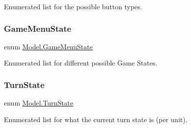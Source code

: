 Enumerated list for the possible button types. \hypertarget{namespace_model_a37db30f781c99ca4eb226b512958bded}{}\label{namespace_model_a37db30f781c99ca4eb226b512958bded} 
\subsubsection{\texorpdfstring{Game\+Menu\+State}{GameMenuState}}
{\footnotesize\ttfamily enum \hyperlink{namespace_model_a37db30f781c99ca4eb226b512958bded}{Model.\+Game\+Menu\+State}\hspace{0.3cm}{\ttfamily [strong]}}

Enumerated list for different possible Game States. \hypertarget{namespace_model_abc9786019e8deab9844b28c3d9c58f86}{}\label{namespace_model_abc9786019e8deab9844b28c3d9c58f86} 
\subsubsection{\texorpdfstring{Turn\+State}{TurnState}}
{\footnotesize\ttfamily enum \hyperlink{namespace_model_abc9786019e8deab9844b28c3d9c58f86}{Model.\+Turn\+State}\hspace{0.3cm}{\ttfamily [strong]}}

Enumerated list for what the current turn state is (per unit). 